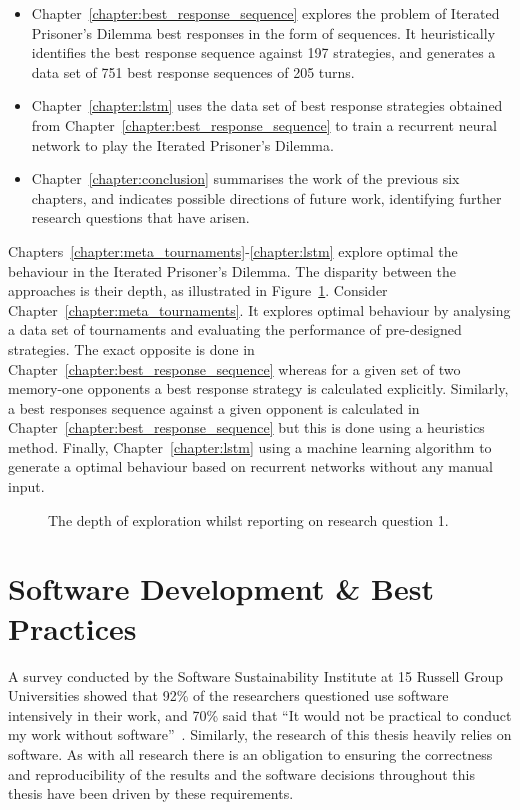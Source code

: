 \begin{itemize}
    \item Chapter~\ref{chapter:best_response_sequence} explores the problem of
    Iterated Prisoner's Dilemma best responses in the form of sequences.
    It heuristically identifies the best response sequence against 197 strategies,
    and generates a data set of 751 best response sequences of 205 turns.
    \item Chapter~\ref{chapter:lstm} uses the data set of best response strategies
    obtained from Chapter~\ref{chapter:best_response_sequence} to train a recurrent
    neural network to play the Iterated Prisoner's Dilemma.
    \item Chapter~\ref{chapter:conclusion} summarises the work of the previous
    six chapters, and indicates possible directions of future work, identifying
    further research questions that have arisen.
\end{itemize}

Chapters~\ref{chapter:meta_tournaments}-\ref{chapter:lstm} explore optimal the
behaviour in the Iterated Prisoner's Dilemma. The disparity between the
approaches is their depth, as illustrated in Figure~\ref{fig:depth_structure}.
Consider Chapter~\ref{chapter:meta_tournaments}. It explores optimal behaviour
by analysing a data set of tournaments and evaluating the performance of
pre-designed strategies. The exact opposite is done in
Chapter~\ref{chapter:best_response_sequence} whereas for a given set of two
memory-one opponents a best response strategy is calculated explicitly.
Similarly, a best responses sequence against a given opponent is calculated in
Chapter~\ref{chapter:best_response_sequence} but this is done using a heuristics
method. Finally, Chapter~\ref{chapter:lstm} using a machine learning algorithm
to generate a optimal behaviour based on recurrent networks without any manual
input.

\begin{figure}[!hbtp]
    \centering
    
    \caption{The depth of exploration whilst reporting on research question 1.}\label{fig:depth_structure}
\end{figure}

\section{Software Development \& Best Practices}\label{section:introduction_software_development}

A survey conducted by the Software Sustainability Institute at 15 Russell Group
Universities showed that 92\% of the researchers questioned use software
intensively in their work, and 70\% said that ``It would not be practical to
conduct my work without software''~\cite{ssi_blog}. Similarly, the research of
this thesis heavily relies on software. As with all research there is an
obligation to ensuring the correctness and reproducibility of the results and the
software decisions throughout this thesis have been driven by these
requirements.

